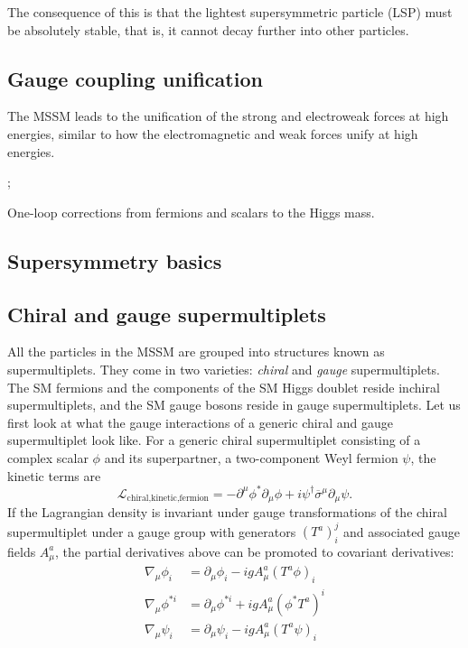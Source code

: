 The consequence of this is that the lightest supersymmetric particle (LSP) must be absolutely stable, that is, it cannot decay further into other particles.
\subsection{Gauge coupling unification}
The MSSM leads to the unification of the strong and electroweak forces at high energies, similar to how the electromagnetic and weak forces unify at high energies.

\begin{marginfigure}
;
\caption{One-loop corrections from fermions and scalars to the Higgs mass.}
\end{marginfigure}

\subsection{Supersymmetry basics}
\subsection{Chiral and gauge supermultiplets}
All the particles in the MSSM are grouped into structures known as supermultiplets. They come in two varieties: \emph{chiral} and \emph{gauge} supermultiplets. The SM fermions and the components of the SM Higgs doublet reside inchiral supermultiplets, and the SM gauge bosons reside in gauge supermultiplets. Let us first look at what the gauge interactions of a generic chiral and gauge supermultiplet look like.
For a generic chiral supermultiplet consisting of a complex scalar $\phi$ and its superpartner, a two-component Weyl fermion $\psi$, the kinetic terms are 
\[\mathcal{L}_{\text{chiral,kinetic,fermion}} = -\partial^\mu\phi^*\partial_\mu\phi + i\psi^{\dagger}\overline{\sigma}^\mu\partial_\mu\psi.\]
If the Lagrangian density is invariant under gauge transformations of the chiral supermultiplet under a gauge group with generators $(T^a)_i^j$ and associated gauge fields $A_\mu^a$, the partial derivatives above can be promoted to covariant derivatives:
\begin{align}
  \nabla_\mu\phi_i &= \partial_\mu\phi_i - igA_\mu^a(T^a\phi)_i\label{eq:phi1}\\
  \nabla_\mu\phi^{*i} &= \partial_\mu\phi^{*i} + igA_\mu^a(\phi^*T^a)^{i}\label{eq:phi2}\\
  \nabla_\mu\psi_i &= \partial_\mu\psi_i - igA_\mu^a(T^a\psi)_i\label{eq:psi}
\end{align}

